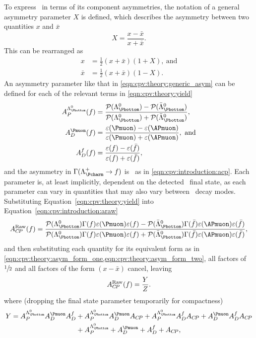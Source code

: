To express \ARaw\ in terms of its component asymmetries, the notation of a
general asymmetry parameter $X$ is defined, which describes the asymmetry
between two quantities $x$ and $\bar{x}$
\begin{equation}
  X = \frac{x - \bar{x}}{x + \bar{x}}.
  \label{eqn:cpv:theory:generic_asym}
\end{equation}
This can be rearranged as
\begin{align}
  x &= \frac{1}{2}(x + \bar{x})(1 + X),\ \text{and}\label{eqn:cpv:theory:asym_form_one}\\
  \bar{x} &= \frac{1}{2}(x + \bar{x})(1 - X).\label{eqn:cpv:theory:asym_form_two}
\end{align}
An asymmetry parameter like that in \cref{eqn:cpv:theory:generic_asym} can be defined for each of the relevant terms in
\cref{eqn:cpv:theory:yield}
\begin{align*}
  \APLb(f) &= \frac{%
    \prob(\PLambdab) - \prob(\APLambdab)
  }{%
    \prob(\PLambdab) + \prob(\APLambdab)
  },\\
  \ADmu(f) &= \frac{%
    \eff(\Pmuon) - \eff(\APmuon)
  }{%
    \eff(\Pmuon) + \eff(\APmuon)
  },\ \text{and}\\
  \ADf(f)  &= \frac{%
    \eff(f) - \eff(\bar{f})
  }{%
    \eff(f) + \eff(\bar{f})
  },
\end{align*}
and the asymmetry in $\Gamma(\LcTof)$ is \ACP\ as in
\cref{eqn:cpv:introduction:acp}.
Each parameter is, at least implicitly, dependent on the detected \PLambdac\
final state, as each parameter can vary in quantities that may also vary
between \PLambdac\ decay modes.
Substituting Equation~\ref{eqn:cpv:theory:yield} into
Equation~\ref{eqn:cpv:introduction:araw}
\begin{equation*}
  \ARaw(f) = \frac{%
    \prob(\PLambdab)\Gamma(f)\eff(\Pmuon)\eff(f) -
    \prob(\APLambdab)\Gamma(\bar{f})\eff(\APmuon)\eff(\bar{f})
  }{%
    \prob(\PLambdab)\Gamma(f)\eff(\Pmuon)\eff(f) +
    \prob(\APLambdab)\Gamma(\bar{f})\eff(\APmuon)\eff(\bar{f})
  },
\end{equation*}
and then substituting each quantity for its equivalent form as in
\cref{eqn:cpv:theory:asym_form_one,eqn:cpv:theory:asym_form_two}, all factors
of $\sfrac{1}{2}$ and all factors of the form $(x - \bar{x})$ cancel, leaving
\begin{equation}
  A_{C\!P}^{\textnormal{Raw}}(f) = \frac{Y}{Z}.
\end{equation}
where (dropping the final state parameter temporarily for compactness)
\begin{align}
  Y = \APLb\ADmu\ADf &+ \APLb\ADmu\ACP + \APLb\ADf\ACP + \ADmu\ADf\ACP \nonumber\\
                     &+ \APLb +  \ADmu + \ADf + \ACP,
\end{align}
